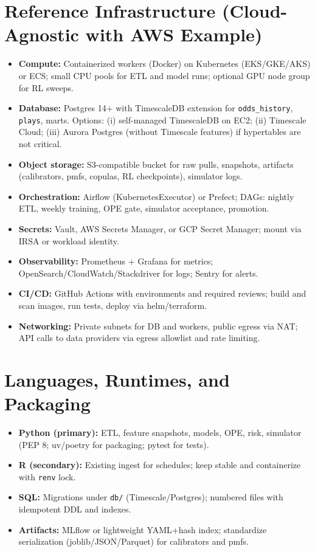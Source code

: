 \section{Reference Infrastructure (Cloud-Agnostic with AWS Example)}
\begin{itemize}
  \item \textbf{Compute:} Containerized workers (Docker) on Kubernetes (EKS/GKE/AKS) or ECS; small CPU pools for ETL and model runs; optional GPU node group for RL sweeps.
  \item \textbf{Database:} Postgres 14+ with TimescaleDB extension for \texttt{odds\_history}, \texttt{plays}, marts. Options: (i) self-managed TimescaleDB on EC2; (ii) Timescale Cloud; (iii) Aurora Postgres (without Timescale features) if hypertables are not critical.
  \item \textbf{Object storage:} S3-compatible bucket for raw pulls, snapshots, artifacts (calibrators, pmfs, copulas, RL checkpoints), simulator logs.
  \item \textbf{Orchestration:} Airflow (KubernetesExecutor) or Prefect; DAGs: nightly ETL, weekly training, OPE gate, simulator acceptance, promotion.
  \item \textbf{Secrets:} Vault, AWS Secrets Manager, or GCP Secret Manager; mount via IRSA or workload identity.
  \item \textbf{Observability:} Prometheus + Grafana for metrics; OpenSearch\slash{}CloudWatch\slash{}Stackdriver for logs; Sentry for alerts.
  \item \textbf{CI/CD:} GitHub Actions with environments and required reviews; build and scan images, run tests, deploy via helm/terraform.
  \item \textbf{Networking:} Private subnets for DB and workers, public egress via NAT; API calls to data providers via egress allowlist and rate limiting.
\end{itemize}

\section{Languages, Runtimes, and Packaging}
\begin{itemize}
  \item \textbf{Python (primary):} ETL, feature snapshots, models, OPE, risk, simulator (PEP 8; uv/poetry for packaging; pytest for tests).
  \item \textbf{R (secondary):} Existing ingest for schedules; keep stable and containerize with \texttt{renv} lock.
  \item \textbf{SQL:} Migrations under \texttt{db/} (Timescale/Postgres); numbered files with idempotent DDL and indexes.
  \item \textbf{Artifacts:} MLflow or lightweight YAML+hash index; standardize serialization (joblib/JSON/Parquet) for calibrators and pmfs.
\end{itemize}

